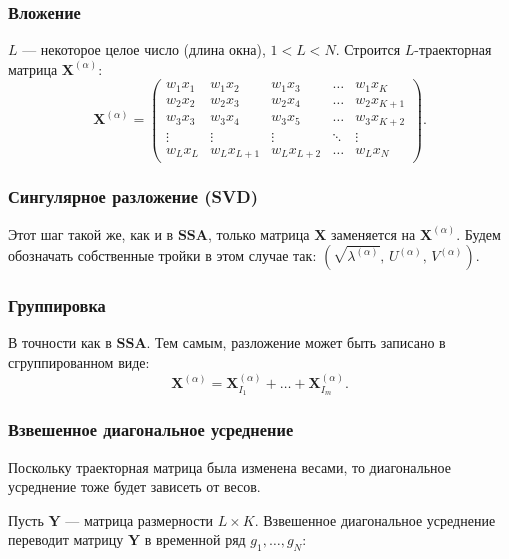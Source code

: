 \documentclass[a4paper, 11pt]{article}
\newcommand{\SSA}{\textbf{SSA}}
\begin{document}
\subsubsection{Вложение}
$L$ --- некоторое целое число (длина окна), $1 < L < N$. Строится $L$-траекторная матрица $\mathbf{X}^{(\alpha)}$:
\begin{equation}
	\label{eq:X_alpha}
	\mathbf{X}^{(\alpha)} =
	\begin{pmatrix}
		w_1 x_1   & w_1 x_2     & w_1 x_3     & \dots  & w_1 x_{K}   \\
		w_2 x_2   & w_2 x_3     & w_2 x_4     & \dots  & w_2 x_{K+1} \\
		w_3 x_3   & w_3 x_4     & w_3 x_5     & \dots  & w_3 x_{K+2} \\
		\vdots    & \vdots      & \vdots      & \ddots & \vdots      \\
		w_L x_{L} & w_L x_{L+1} & w_L x_{L+2} & \dots  & w_L x_{N}
	\end{pmatrix}.
\end{equation}

\subsubsection{Сингулярное разложение (SVD)}
Этот шаг такой же, как и в $\SSA$, только матрица $\mathbf{X}$ заменяется на $\mathbf{X}^{(\alpha)}$. Будем обозначать собственные тройки в этом случае так: $(\sqrt{\lambda^{(\alpha)}},\,U^{(\alpha)},\,V^{(\alpha)})$.

\subsubsection{Группировка}
В точности как в $\SSA$. Тем самым, разложение может быть записано в сгруппированном виде:
\begin{equation*}
	\mathbf{X}^{(\alpha)} = \mathbf{X}^{(\alpha)}_{I_1} + \dots + \mathbf{X}^{(\alpha)}_{I_m}.
\end{equation*}

\subsubsection{Взвешенное диагональное усреднение}
Поскольку траекторная матрица была изменена весами, то диагональное усреднение тоже будет зависеть от весов.

Пусть $\mathbf{Y}$ --- матрица размерности $L \times K$. Взвешенное диагональное усреднение переводит матрицу $\mathbf{Y}$ в временной ряд $g_1, \dots, g_{N} $:
\end{document}
